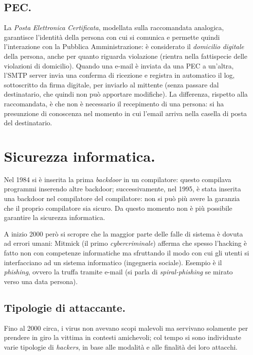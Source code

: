 \documentclass[a4page, 11pt, twocolumn]{article}
\begin{document}
\subsection{PEC.}
La \textit{Posta Elettronica Certificata}, modellata sulla raccomandata analogica, garantisce l'identità della persona con cui si comunica e permette quindi l'interazione con la Pubblica Amministrazione: è considerato il \textit{domicilio digitale} della persona, anche per quanto riguarda violazione (rientra nella fattispecie delle violazioni di domicilio).
Quando una e-mail è inviata da una PEC a un'altra, l'SMTP server invia una conferma di ricezione e registra in automatico il log, sottoscritto da firma digitale, per inviarlo al mittente (senza passare dal destinatario, che quindi non può apportare modifiche).
La differenza, rispetto alla raccomandata, è che non è necessario il recepimento di una persona: si ha presunzione di conoscenza nel momento in cui l'email arriva nella casella di posta del destinatario.

\section{Sicurezza informatica.}
Nel 1984 si è inserita la prima \textit{backdoor} in un compilatore: questo compilava programmi inserendo altre backdoor; successivamente, nel 1995, è stata inserita una backdoor nel compilatore del compilatore: non si può più avere la garanzia che il proprio compilatore sia sicuro.
Da questo momento non è più possibile garantire la sicurezza informatica.

A inizio 2000 però si scropre che la maggior parte delle falle di sistema è dovuta ad errori umani: Mitmick (il primo \textit{cybercriminale}) afferma che spesso l'hacking è fatto non con competenze informatiche ma sfruttando il modo con cui gli utenti si interfacciano ad un sistema informatico (ingegneria sociale).
Esempio è il \textit{phishing}, ovvero la truffa tramite e-mail (si parla di \textit{spiral-phishing} se mirato verso una data persona). \newline

\subsection{Tipologie di attaccante.}
Fino al 2000 circa, i virus non avevano scopi malevoli ma servivano solamente per prendere in giro la vittima in contesti amichevoli; col tempo si sono individuate varie tipologie di \textit{hackers}, in base alle modalità e alle finalità dei loro attacchi.
\end{document}
